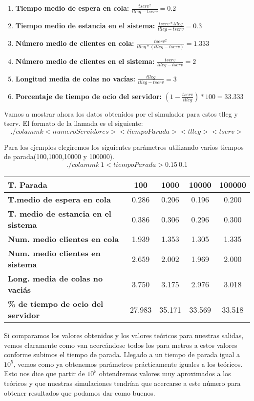 \documentclass[]{article}
\begin{document}
\begin{enumerate}
	\item \textbf{Tiempo medio de espera en cola: }$\frac{tserv^2}{tlleg-tserv}=0.2$
	\item \textbf{Tiempo medio de estancia en el sistema: }$\frac{tserv*tlleg}{tlleg-tserv} = 0.3$
	\item \textbf{Número medio de clientes en cola: }$\frac{tserv^2}{tlleg*(tlleg-tserv)}=1.333$
	\item \textbf{Número medio de clientes en el sistema: }$\frac{tserv}{tlleg-tserv}=2$
	\item \textbf{Longitud media de colas no vacías: }$\frac{tlleg}{tlleg-tserv}=3$
	\item \textbf{Porcentaje de tiempo de ocio del servidor: }$(1-\frac{tserv}{tlleg})*100=33.333$
\end{enumerate}

Vamos a mostrar ahora los datos obtenidos por el simulador para estos tlleg y tserv. El formato de la llamada es el siguiente:
$$./colammk <numeroServidores> <tiempoParada> <tlleg> <tserv>$$

Para los ejemplos elegiremos los siguientes parámetros utilizando varios tiempos de parada(100,1000,10000 y 100000).
$$./colammk\ 1 <tiempoParada> 0.15\ 0.1$$

\begin{table}[H]
	\begin{center}
		\begin{tabularx}{1\textwidth}{|X|c|c|c|c|}
			\hline
			 \textbf{T. Parada} & 100 & 1000 & 10000 & 100000 \\
			\hline \hline
			\textbf{T.medio de espera en cola}& 0.286& 0.206&0.196 & 0.200\\ \hline
			\textbf{T. medio de estancia en el sistema}& 0.386 & 0.306&0.296 & 0.300\\ \hline
			\textbf{Num. medio clientes en cola}& 1.939 & 1.353& 1.305&1.335\\ \hline
			\textbf{Num. medio clientes en sistema}& 2.659 & 2.002&1.969 &2.000\\ \hline
			\textbf{Long. media de colas no vaciás}&3.750& 3.175&2.976 &3.018\\ \hline
			\textbf{\% de tiempo de ocio del servidor}&27.983&35.171 &33.569 &33.518\\ \hline
		\end{tabularx}
		
	\end{center}
\end{table}
\newpage
Si comparamos los valores obtenidos y los valores teóricos para nuestras salidas, vemos claramente como van acercándose todos los para metros a estos valores conforme subimos el tiempo de parada. Llegado a un tiempo de parada igual a $10^5$, vemos como ya obtenemos parámetros prácticamente iguales a los teóricos. Esto nos dice que partir de $10^5$ obtendremos valores muy aproximados a los teóricos y que nuestras simulaciones tendrían que acercarse a este número para obtener resultados que podamos dar como buenos.
\end{document}

